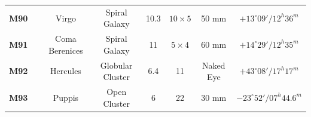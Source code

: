 \documentclass[a4paper,12pt]{extarticle}
\begin{document}
\begin{table}[H]
\begin{tabular}{clcccccc}
\rowcolor[HTML]{00FFFF} 
\textbf{M90}                             &                                                                                          & Virgo                                         & Spiral Galaxy                & 10.3                                                                                          & $10\times5$                                                                                             & 50 mm                                                                                       & $+13^\circ 09'/ 12^h 36^m$                                                                   \\
\rowcolor[HTML]{00FFFF} 
\textbf{M91}                             &                                                                                          & Coma Berenices                                & Spiral Galaxy                 & 11                                                                                          & $5\times4$                                                                                              & 60 mm                                                                                       & $+14^\circ 29'/ 12^h 35^m$                                                                   \\
\rowcolor[HTML]{FFF2CC} 
\textbf{M92}                             &                                                                                          & Hercules                                      & Globular Cluster              & 6.4                                                                                           & 11                                                                                              & Naked Eye                                                                                   & $+43^\circ 08'/ 17^h 17^m$                                                                   \\
\rowcolor[HTML]{D9EAD3} 
\textbf{M93}                             &                                                                                          & Puppis                                        & Open Cluster                 & 6                                                                                             & 22                                                                                              & 30 mm                                                                                       & $-23^\circ 52'/ 07^h 44.6^m$                                                                 \\

\end{tabular}
\end{table}
\end{document}
